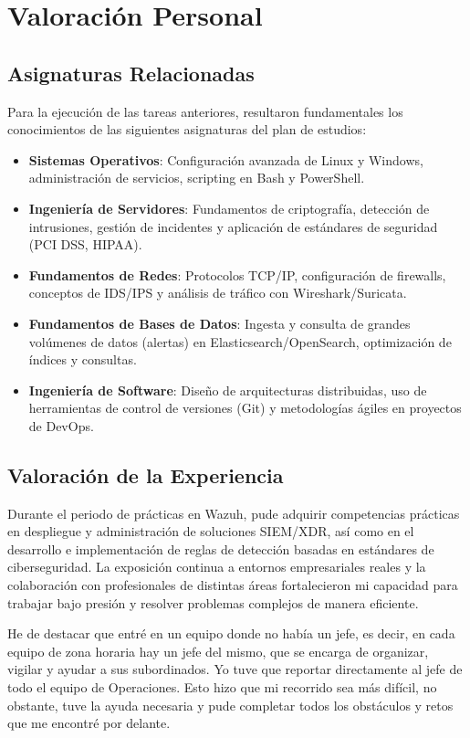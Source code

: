 \chapter{Valoración Personal}

\section{Asignaturas Relacionadas}
Para la ejecución de las tareas anteriores, resultaron fundamentales los conocimientos de las siguientes asignaturas del plan de estudios:
\begin{itemize}
  \item \textbf{Sistemas Operativos}: Configuración avanzada de Linux y Windows, administración de servicios, scripting en Bash y PowerShell.  
  \item \textbf{Ingeniería de Servidores}: Fundamentos de criptografía, detección de intrusiones, gestión de incidentes y aplicación de estándares de seguridad (PCI DSS, HIPAA).  
  \item \textbf{Fundamentos de Redes}: Protocolos TCP/IP, configuración de firewalls, conceptos de IDS/IPS y análisis de tráfico con Wireshark/Suricata.  
  \item \textbf{Fundamentos de Bases de Datos}: Ingesta y consulta de grandes volúmenes de datos (alertas) en Elasticsearch/OpenSearch, optimización de índices y consultas.  
  \item \textbf{Ingeniería de Software}: Diseño de arquitecturas distribuidas, uso de herramientas de control de versiones (Git) y metodologías ágiles en proyectos de DevOps.  
\end{itemize}

\section{Valoración de la Experiencia}
Durante el periodo de prácticas en Wazuh, pude adquirir competencias prácticas en despliegue y administración de soluciones SIEM/XDR, así como en el desarrollo e implementación de reglas de detección basadas en estándares de ciberseguridad. La exposición continua a entornos empresariales reales y la colaboración con profesionales de distintas áreas fortalecieron mi capacidad para trabajar bajo presión y resolver problemas complejos de manera eficiente.

He de destacar que entré en un equipo donde no había un jefe, es decir, en cada equipo de zona horaria hay un jefe del mismo, que se encarga de organizar, vigilar y ayudar a sus subordinados. Yo tuve que reportar directamente al jefe de todo el equipo de Operaciones. Esto hizo que mi recorrido sea más difícil, no obstante, tuve la ayuda necesaria y pude completar todos los obstáculos y retos que me encontré por delante.